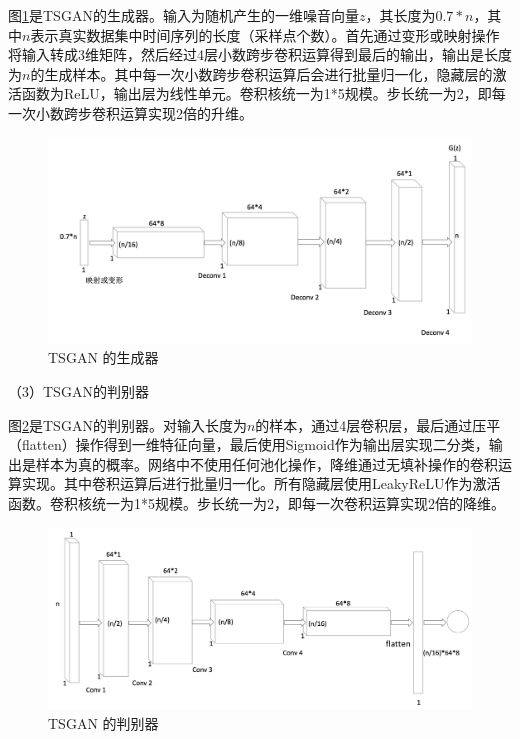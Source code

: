 图\ref{fig:gan-ts-generator}是TSGAN的生成器。输入为随机产生的一维噪音向量$z$，其长度为$0.7*n$，其中$n$表示真实数据集中时间序列的长度（采样点个数）。首先通过变形或映射操作将输入转成3维矩阵，然后经过4层小数跨步卷积运算得到最后的输出，输出是长度为$n$的生成样本。其中每一次小数跨步卷积运算后会进行批量归一化，隐藏层的激活函数为ReLU，输出层为线性单元。卷积核统一为1*5规模。步长统一为2，即每一次小数跨步卷积运算实现2倍的升维。

\begin{figure}[H]
\centering
\includegraphics[scale=0.5]{figures/gan-ts-generator.png}
\caption{TSGAN 的生成器}
\label{fig:gan-ts-generator}
\end{figure}

（3）TSGAN的判别器

图\ref{fig:gan-ts-discriminator}是TSGAN的判别器。对输入长度为$n$的样本，通过4层卷积层，最后通过压平（flatten）操作得到一维特征向量，最后使用Sigmoid作为输出层实现二分类，输出是样本为真的概率。网络中不使用任何池化操作，降维通过无填补操作的卷积运算实现。其中卷积运算后进行批量归一化。所有隐藏层使用LeakyReLU作为激活函数。卷积核统一为1*5规模。步长统一为2，即每一次卷积运算实现2倍的降维。

\begin{figure}[H]
\centering
\includegraphics[scale=0.5]{figures/gan-ts-discriminator.png}
\caption{TSGAN 的判别器}
\label{fig:gan-ts-discriminator}
\end{figure}


